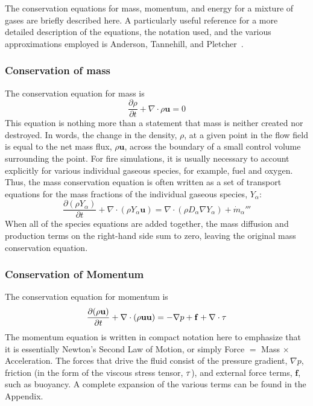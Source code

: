\documentclass[graybox]{svmult}
\begin{document}
The conservation equations for mass, momentum, and energy for a mixture of gases are briefly described here. A particularly useful reference for a more detailed description of the equations, the notation used, and the various approximations employed is Anderson, Tannehill, and Pletcher~\cite{Anderson}.

\subsubsection{Conservation of mass}

The conservation equation for mass is
\begin{equation}
\frac{\partial \rho}{\partial t} + \nabla \cdot \rho \mathbf{u} = 0
\label{eq:masscon}
\end{equation}
This equation is nothing more than a statement that mass is neither created nor destroyed. In words, the change in the density, $\rho$, at a given point in the flow field is equal to the net mass flux, $\rho \mathbf{u}$, across the boundary of a small control volume surrounding the point. For fire simulations, it is usually necessary to account explicitly for various individual gaseous species, for example, fuel and oxygen. Thus, the mass conservation equation is often written as a set of transport equations for the mass fractions of the individual gaseous species, $Y_\alpha$:
\begin{equation}
\frac{\partial (\rho Y_\alpha)}{\partial t} + \nabla \cdot (\rho Y_\alpha \mathbf{u}) = \nabla \cdot \left( \rho D_\alpha \nabla Y_\alpha \right) + \dot{m}_\alpha'''
\label{eq:speccon}
\end{equation}
When all of the species equations are added together, the mass diffusion and production terms on the right-hand side sum to zero, leaving the original mass conservation equation.

\subsubsection{Conservation of Momentum}

The conservation equation for momentum is
\begin{equation}
\frac{\partial (\rho \mathbf{u})}{\partial t} + \nabla \cdot (\rho \mathbf{u} \mathbf{u}) = -\nabla p + \mathbf{f} + \nabla \cdot \tens{\tau}
\label{eq:momcon}
\end{equation}
The momentum equation is written in compact notation here to emphasize that it is essentially Newton's Second Law of Motion, or simply Force $=$ Mass $\times$ Acceleration. The forces that drive the fluid consist of the pressure gradient, $\nabla p$, friction (in the form of the viscous stress tensor, $\tens{\tau}$), and external force terms, $\mathbf{f}$, such as buoyancy. A complete expansion of the various terms can be found in the Appendix.
\end{document}
